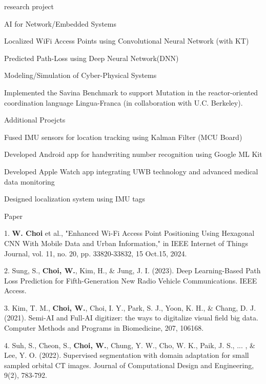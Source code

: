 \documentclass[
	11pt, %
]{resume} %
\begin{document}
\begin{rSection}{research project}
	\begin{rSubsection}{AI for Network/Embedded Systems}{}{}{}
		\item Localized WiFi Access Points using Convolutional Neural Network (with KT)
		\item Predicted Path-Loss using Deep Neural Network(DNN)
	\end{rSubsection}

	\begin{rSubsection}{Modeling/Simulation of Cyber-Physical Systems}{}{}{}
		\item Implemented the Savina Benchmark to support Mutation in the reactor-oriented coordination language Lingua-Franca (in collaboration with U.C. Berkeley).
	\end{rSubsection}

	
	\begin{rSubsection}{Additional Proejcts}{}{}{}
		\item Fused IMU sensors for location tracking using Kalman Filter (MCU Board)
		\item Developed Android app for handwriting number recognition using Google ML Kit
		\item Developed Apple Watch app integrating UWB technology and advanced medical data monitoring
		\item Designed localization system using IMU tags
	\end{rSubsection}
\end{rSection}



\begin{rSection}{Paper}

	1. \textbf{W. Choi} et al., "Enhanced Wi-Fi Access Point Positioning Using Hexagonal CNN With Mobile Data and Urban Information," in IEEE Internet of Things Journal, vol. 11, no. 20, pp. 33820-33832, 15 Oct.15, 2024.

	2. Sung, S., \textbf{Choi, W.}, Kim, H., \& Jung, J. I. (2023). Deep Learning-Based Path Loss Prediction for Fifth-Generation New Radio Vehicle Communications. IEEE Access.
	
	3. Kim, T. M., \textbf{Choi, W.}, Choi, I. Y., Park, S. J., Yoon, K. H., \& Chang, D. J. (2021). Semi-AI and Full-AI digitizer: the ways to digitalize visual field big data. Computer Methods and Programs in Biomedicine, 207, 106168.

	4. Suh, S., Cheon, S., \textbf{Choi, W.}, Chung, Y. W., Cho, W. K., Paik, J. S., ... , \& Lee, Y. O. (2022). Supervised segmentation with domain adaptation for small sampled orbital CT images. Journal of Computational Design and Engineering, 9(2), 783-792.


\end{rSection}
\end{document}
